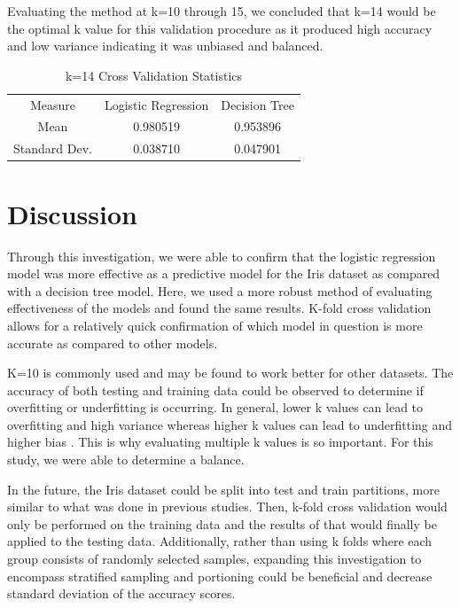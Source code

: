 \documentclass[journal]{IEEEtran}
\begin{document}
\vspace{60px}
Evaluating the method at k=10 through 15, we concluded that k=14 would be the optimal k value for this validation procedure as it produced high accuracy and low variance indicating it was unbiased and balanced. 

\begin{table}[h!]
    \centering
    \begin{tabular}{ c | c c }
    Measure & Logistic Regression & Decision Tree \\
    Mean&	0.980519&	0.953896 \\
    Standard Dev.	&0.038710&	0.047901
    \end{tabular}
    \caption{k=14 Cross Validation Statistics}
    \label{table:MultiFoldCV-k14}
    \end{table}

\section{Discussion}
\label{sec:discussion}
Through this investigation, we were able to confirm that the logistic regression model was more effective as a predictive model for the Iris dataset as compared with a decision tree model. Here, we used a more robust method of evaluating effectiveness of the models and found the same results. K-fold cross validation allows for a relatively quick confirmation of which model in question is more accurate as compared to other models. 

K=10 is commonly used and may be found to work better for other datasets. The accuracy of both testing and training data could be observed to determine if overfitting or underfitting is occurring. In general, lower k values can lead to overfitting and high variance whereas higher k values can lead to underfitting and higher bias \cite{b5}. This is why evaluating multiple k values is so important. For this study, we were able to determine a balance.

In the future, the Iris dataset could be split into test and train partitions, more similar to what was done in previous studies. Then, k-fold cross validation would only be performed on the training data and the results of that would finally be applied to the testing data. Additionally, rather than using k folds where each group consists of randomly selected samples, expanding this investigation to encompass stratified sampling and portioning could be beneficial and decrease standard deviation of the accuracy scores.
\end{document}

